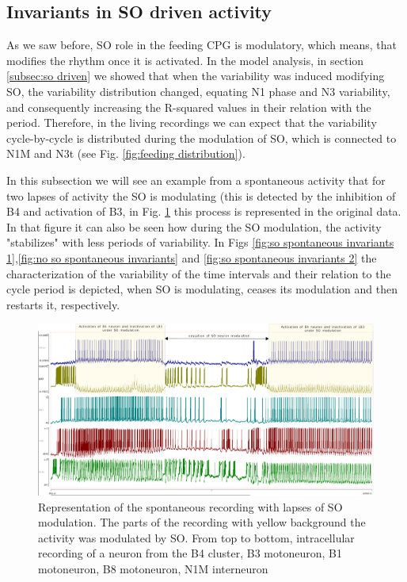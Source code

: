 \clearpage
\newpage
\subsection{Invariants in SO driven activity}
As we saw before, SO role in the feeding CPG is modulatory, which means, that modifies the rhythm once it is activated. In the model analysis, in section \ref{subsec:so driven} we showed that when the variability was induced modifying SO, the variability distribution changed, equating N1 phase and N3 variability, and consequently increasing the R-squared values in their relation with the period. Therefore, in the living recordings we can expect that the variability cycle-by-cycle is distributed during the modulation of SO, which is connected to N1M and N3t (see Fig. \ref{fig:feeding distribution}). 

In this subsection we will see an example from a spontaneous activity that for two lapses of activity the SO is modulating (this is detected by the inhibition of B4 and activation of B3, in Fig. \ref{fig:SO-spontaneous-driven} this process is represented in the original data. In that figure it can also be seen how during the SO modulation, the activity "stabilizes" with less periods of variability. In Figs \ref{fig:so spontaneous invariants 1},\ref{fig:no so spontaneous invariants} and \ref{fig:so spontaneous invariants 2} the characterization of the variability of the time intervals and their relation to the cycle period is depicted, when SO is modulating, ceases its modulation and then restarts it, respectively. 


 
 
 \begin{figure}[htbp]
 	\centering
 	\includegraphics[width=\textwidth]{./img/invariants/SO-spontaneuous-driven.pdf}
 	\caption{Representation of the spontaneous recording with lapses of SO modulation. The parts of the recording with yellow background the activity was modulated by SO. From top to bottom, intracellular recording of a neuron from the B4 cluster, B3 motoneuron, B1 motoneuron, B8 motoneuron, N1M interneuron}
 	\label{fig:SO-spontaneous-driven}
 \end{figure}
 
